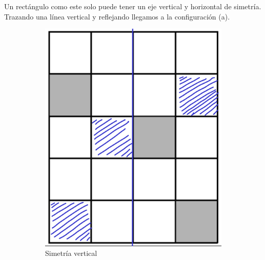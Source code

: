\newpage

\begin{solution}[(Problema 1)]
    Un rectángulo como este solo puede tener un eje vertical y horizontal de simetría.
    Trazando una línea vertical y reflejando llegamos a la configuración (a).
    \begin{figure}[H]
        \centering
        \begin{subfigure}{0.27\textwidth}
            \includegraphics[width=\textwidth]{content/figure4}
            \caption{Simetría vertical}
        \end{subfigure}
        \hspace{1cm}
        \begin{subfigure}{0.27\textwidth}

\end{subfigure}
\end{figure}
\end{solution}

